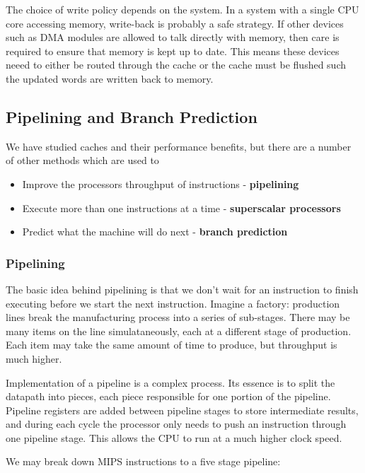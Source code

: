 \documentclass{article}
\begin{document}
	\par 
	The choice of write policy depends on the system. In a system with a single CPU core accessing memory, write-back is probably a safe strategy. If other devices such as DMA modules are allowed to talk directly with memory, then care is required to ensure that memory is kept up to date. This means these devices neeed to either be routed through the cache or the cache must be flushed such the updated words are written back to memory.
	
	\subsection{Pipelining and Branch Prediction}
	We have studied caches and their performance benefits, but there are a number of other methods which are used to 
	\begin{itemize}
		\item Improve the processors throughput of instructions - \textbf{pipelining}
		\item Execute more than one instructions at a time - \textbf{superscalar processors}
		\item Predict what the machine will do next - \textbf{branch prediction}
	\end{itemize}	
	
	\subsubsection{Pipelining}
	The basic idea behind pipelining is that we don't wait for an instruction to finish executing before we start the next instruction. Imagine a factory: production lines break the manufacturing process into a series of sub-stages. There may be many items on the line simulataneously, each at a different stage of production. Each item may take the same amount of time to produce, but throughput is much higher.
	
	\par 
	Implementation of a pipeline is a complex process. Its essence is to split the datapath into pieces, each piece responsible for one portion of the pipeline. Pipeline registers are added between pipeline stages to store intermediate results, and during each cycle the processor only needs to push an instruction through one pipeline stage. This allows the CPU to run at a much higher clock speed.
	
	\par We may break down MIPS instructions to a five stage pipeline:
	
\end{document}
